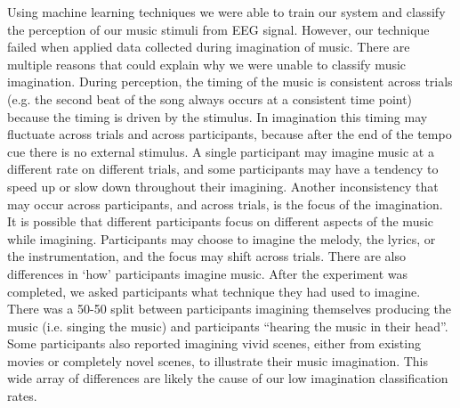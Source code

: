 Using machine learning techniques we were able to train our system and classify the perception of our music stimuli from EEG signal. 
However, our technique failed when applied data collected during imagination of music.
There are multiple reasons that could explain why we were unable to classify music imagination.
During perception, the timing of the music is consistent across trials (e.g. the second beat of the song always occurs at a consistent time point) because the timing is driven by the stimulus. 
In imagination this timing may fluctuate across trials and across participants, because after the end of the tempo cue there is no external stimulus.
A single participant may imagine music at a different rate on different trials, and some participants may have a tendency to speed up or slow down throughout their imagining. 
Another inconsistency that may occur across participants, and across trials, is the focus of the imagination. 
It is possible that different participants focus on different aspects of the music while imagining.
Participants may choose to imagine the melody, the lyrics, or the instrumentation, and the focus may shift across trials.
There are also differences in `how' participants imagine music. 
After the experiment was completed, we asked participants what technique they had used to imagine. 
There was a 50-50 split between participants imagining themselves producing the music (i.e. singing the music) and participants ``hearing the music in their head''. 
Some participants also reported imagining vivid scenes, either from existing movies or completely novel scenes, to illustrate their music imagination.
This wide array of differences are likely the cause of our low imagination classification rates. 

